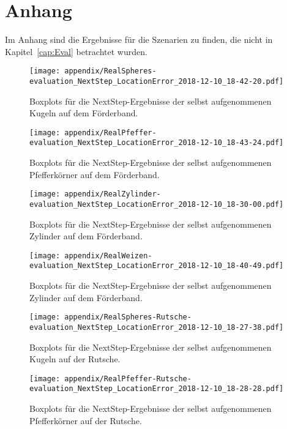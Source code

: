 \chapter{Anhang}
\label{cap:appendix}

Im Anhang sind die Ergebnisse für die Szenarien zu finden, die nicht in Kapitel~\ref{cap:Eval} betrachtet wurden.

\begin{figure}[h]
    \centering
	\texttt{[image: appendix/RealSpheres-evaluation\_NextStep\_LocationError\_2018-12-10\_18-42-20.pdf]}
    \caption{Boxplots für die NextStep-Ergebnisse der selbst aufgenommenen Kugeln auf dem Förderband.}
\end{figure}

\begin{figure}[h]
    \centering
	\texttt{[image: appendix/RealPfeffer-evaluation\_NextStep\_LocationError\_2018-12-10\_18-43-24.pdf]}
    \caption{Boxplots für die NextStep-Ergebnisse der selbst aufgenommenen Pfefferkörner auf dem Förderband.}
\end{figure}

\begin{figure}[h]
    \centering
	\texttt{[image: appendix/RealZylinder-evaluation\_NextStep\_LocationError\_2018-12-10\_18-30-00.pdf]}
    \caption{Boxplots für die NextStep-Ergebnisse der selbst aufgenommenen Zylinder auf dem Förderband.}
\end{figure}

\begin{figure}[h]
    \centering
	\texttt{[image: appendix/RealWeizen-evaluation\_NextStep\_LocationError\_2018-12-10\_18-40-49.pdf]}
    \caption{Boxplots für die NextStep-Ergebnisse der selbst aufgenommenen Zylinder auf dem Förderband.}
\end{figure}

\begin{figure}[h]
    \centering
	\texttt{[image: appendix/RealSpheres-Rutsche-evaluation\_NextStep\_LocationError\_2018-12-10\_18-27-38.pdf]}
    \caption{Boxplots für die NextStep-Ergebnisse der selbst aufgenommenen Kugeln auf der Rutsche.}
\end{figure}

\begin{figure}[h]
    \centering
	\texttt{[image: appendix/RealPfeffer-Rutsche-evaluation\_NextStep\_LocationError\_2018-12-10\_18-28-28.pdf]}
    \caption{Boxplots für die NextStep-Ergebnisse der selbst aufgenommenen Pfefferkörner auf der Rutsche.}
\end{figure}

